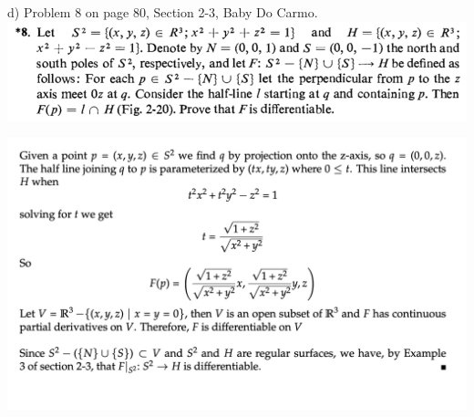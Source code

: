 \documentclass[10pt,letterpaper]{hmcpset}
\begin{document}
\newpage \begin{problem}
  d) Problem 8 on page 80, Section 2-3, Baby Do Carmo. \\

\includegraphics[scale=0.7]{Cd.png}
\end{problem}
\begin{solution}
  \includegraphics[scale=.8]{d_solution.png}
\end{solution}
\end{document}

